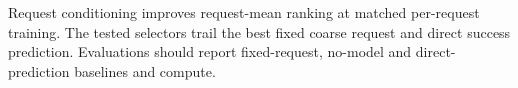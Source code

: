 \begin{revblock}\nopagebreak
Request conditioning improves request-mean ranking at matched per-request training. The tested selectors trail the best fixed coarse request and direct success prediction. Evaluations should report fixed-request, no-model and direct-prediction baselines and compute.
\end{revblock}


